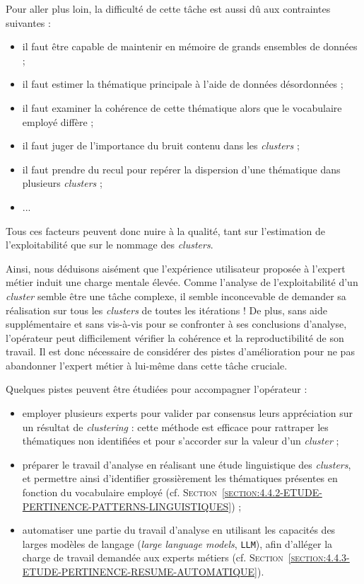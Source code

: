 			Pour aller plus loin, la difficulté de cette tâche est aussi dû aux contraintes suivantes :
			\begin{itemize}
				\item il faut être capable de maintenir en mémoire de grands ensembles de données ;
				\item il faut estimer la thématique principale à l'aide de données désordonnées ;
				\item il faut examiner la cohérence de cette thématique alors que le vocabulaire employé diffère ;
				\item il faut juger de l'importance du bruit contenu dans les \textit{clusters} ;
				\item il faut prendre du recul pour repérer la dispersion d'une thématique dans plusieurs \textit{clusters} ;
				\item ...
			\end{itemize}
			Tous ces facteurs peuvent donc nuire à la qualité, tant sur l'estimation de l'exploitabilité que sur le nommage des \textit{clusters}.
			
			Ainsi, nous déduisons aisément que l'expérience utilisateur proposée à l'expert métier induit une charge mentale élevée.
			Comme l'analyse de l'exploitabilité d'un \textit{cluster} semble être une tâche complexe, il semble inconcevable de demander sa réalisation sur tous les \textit{clusters} de toutes les itérations !
			De plus, sans aide supplémentaire et sans vis-à-vis pour se confronter à ses conclusions d'analyse, l'opérateur peut difficilement vérifier la cohérence et la reproductibilité de son travail.
			Il est donc nécessaire de considérer des pistes d'amélioration pour ne pas abandonner l'expert métier à lui-même dans cette tâche cruciale.
			
			Quelques pistes peuvent être étudiées pour accompagner l'opérateur :
			\begin{itemize}
				\item employer plusieurs experts pour valider par consensus leurs appréciation sur un résultat de \textit{clustering} : cette méthode est efficace pour rattraper les thématiques non identifiées et pour s'accorder sur la valeur d'un \textit{cluster} ;
				\item préparer le travail d'analyse en réalisant une étude linguistique des \textit{clusters}, et permettre ainsi d'identifier grossièrement les thématiques présentes en fonction du vocabulaire employé (cf. \textsc{Section~\ref{section:4.4.2-ETUDE-PERTINENCE-PATTERNS-LINGUISTIQUES}}) ;
				\item automatiser une partie du travail d'analyse en utilisant les capacités des larges modèles de langage (\textit{large language models}, \texttt{LLM}), afin d'alléger la charge de travail demandée aux experts métiers (cf. \textsc{Section~\ref{section:4.4.3-ETUDE-PERTINENCE-RESUME-AUTOMATIQUE}}).
			\end{itemize}
	
